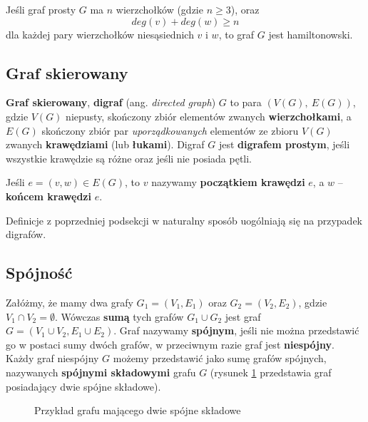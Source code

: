 \begin{theorem}[Orego, 1960]\label{theorem:orego}
Jeśli graf prosty $G$ ma $n$ wierzchołków (gdzie $n\geq 3$), oraz
\[
deg(v) + deg(w) \geq n
\]
dla każdej pary wierzchołków niesąsiednich $v$ i $w$, to graf $G$ jest hamiltonowski.
\end{theorem}

\subsection*{Graf skierowany}

\textbf{Graf skierowany}, \textbf{digraf} (ang. \textit{directed graph}) $G$ to para $(V(G),\ E(G))$, gdzie $V(G)$ niepusty, skończony zbiór elementów zwanych \textbf{wierzchołkami}, a $E(G)$ skończony zbiór par \emph{uporządkowanych} elementów ze zbioru $V(G)$ zwanych \textbf{krawędziami} (lub \textbf{łukami}\cite[135]{wilson}). Digraf $G$ jest \textbf{digrafem prostym}, jeśli wszystkie krawędzie są różne oraz jeśli nie posiada pętli. 

Jeśli $e = (v,w) \in E(G)$, to $v$ nazywamy \textbf{początkiem krawędzi} $e$, a $w$ -- \textbf{końcem krawędzi} $e$.

Definicje z poprzedniej podsekcji w naturalny sposób uogólniają się na przypadek digrafów\cite[136]{wilson}. 

\subsection*{Spójność}

Załóżmy, że mamy dwa grafy $G_1 = (V_1,E_1)$ oraz $G_2 = (V_2,E_2)$, gdzie $V_1 \cap V_2 = \emptyset$. Wówczas \textbf{sumą} tych grafów $G_1 \cup G_2$ jest graf $G=(V_1\cup V_2, E_1\cup E_2)$. Graf nazywamy \textbf{spójnym}, jeśli nie można przedstawić go w postaci sumy dwóch grafów, w przeciwnym razie graf jest \textbf{niespójny}\cite[22]{wilson}. Każdy graf niespójny $G$ możemy przedstawić jako sumę grafów spójnych, nazywanych \textbf{spójnymi składowymi} grafu $G$ (rysunek \ref{fig:connected-copoments-example} przedstawia graf posiadający dwie spójne składowe). 

\begin{figure}[h]
\centering
{}
\caption{Przykład grafu mającego dwie spójne składowe} \label{fig:connected-copoments-example}
\end{figure}

